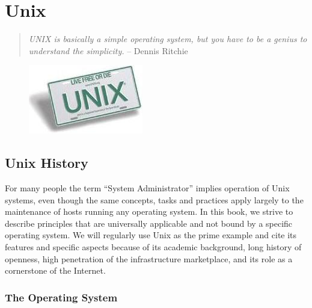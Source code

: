 \chapter{Unix}
\label{chap:unix}

\begin{quote}
{\em {\textsc{UNIX} is basically a simple
operating system, but you have to be a genius to
understand the simplicity.}} -- Dennis
Ritchie
\end{quote}

\begin{figure}[hb]
	\raggedleft
	\includegraphics[width=.25\textwidth]{02/pics/unix-plate}
	\label{fig:unix-plate}
\end{figure}

\section{Unix History}
\label{unix:history}



For many people the term ``System Administrator''
implies operation of Unix systems, even though the
same concepts, tasks and practices apply largely to
the maintenance of hosts running any operating system.
In this book, we strive to describe principles that
are universally applicable and not bound by a specific
operating system.  We will regularly use Unix as the
prime example and cite its features and specific
aspects because of its academic background, long
history of openness, high penetration of the
infrastructure marketplace, and its role as
a cornerstone of the Internet.

\subsection{The Operating System}
\label{unix:history:os}


